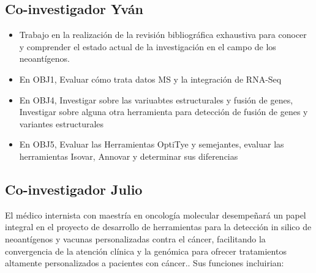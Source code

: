 \documentclass[a4paper,11pt]{article}
\begin{document}
\subsection{Co-investigador Yván}
\begin{itemize}


\item  Trabajo en la realización de la revisión bibliográfica exhaustiva para conocer y comprender el estado actual de la investigación en el campo de los neoantígenos.
\item En OBJ1, Evaluar cómo trata datos MS y la integración de RNA-Seq
\item En OBJ4, Investigar sobre las variuabtes estructurales y fusión de genes, Investigar sobre alguna otra herramienta para detección de fusión de genes y variantes estructurales
\item En OBJ5, Evaluar las Herramientas OptiTye y semejantes, evaluar las herramientas Isovar, Annovar y determinar sus diferencias
\end{itemize}

\subsection{Co-investigador Julio}

El médico internista con maestría en oncología molecular desempeñará un papel integral en el proyecto de desarrollo de herramientas para la detección in silico de neoantígenos y vacunas personalizadas contra el cáncer, facilitando la convergencia de la atención clínica y la genómica para ofrecer tratamientos altamente personalizados a pacientes con cáncer.. Sus funciones incluirian:
\end{document}
